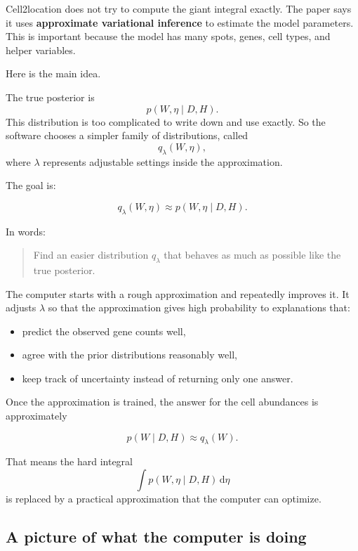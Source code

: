 \documentclass[11pt]{article}
\newcommand{\dd}{\mathrm{d}}
\newcommand{\term}[1]{\textbf{#1}}
\begin{document}
Cell2location does not try to compute the giant integral exactly. The paper says it uses \term{approximate variational inference} to estimate the model parameters. This is important because the model has many spots, genes, cell types, and helper variables.

Here is the main idea.

The true posterior is
\[
p(W,\eta\mid D,H).
\]
This distribution is too complicated to write down and use exactly. So the software chooses a simpler family of distributions, called
\[
q_\lambda(W,\eta),
\]
where $\lambda$ represents adjustable settings inside the approximation.

The goal is:

\begin{mathbox}
\[
q_\lambda(W,\eta)\approx p(W,\eta\mid D,H).
\]
\end{mathbox}

In words:

\begin{quote}
Find an easier distribution $q_\lambda$ that behaves as much as possible like the true posterior.
\end{quote}

The computer starts with a rough approximation and repeatedly improves it. It adjusts $\lambda$ so that the approximation gives high probability to explanations that:

\begin{itemize}
  \item predict the observed gene counts well,
  \item agree with the prior distributions reasonably well,
  \item keep track of uncertainty instead of returning only one answer.
\end{itemize}

Once the approximation is trained, the answer for the cell abundances is approximately

\begin{mathbox}
\[
p(W\mid D,H)\approx q_\lambda(W).
\]
\end{mathbox}

That means the hard integral
\[
\int p(W,\eta\mid D,H)\,\dd\eta
\]
is replaced by a practical approximation that the computer can optimize.

\subsection{A picture of what the computer is doing}
\end{document}
